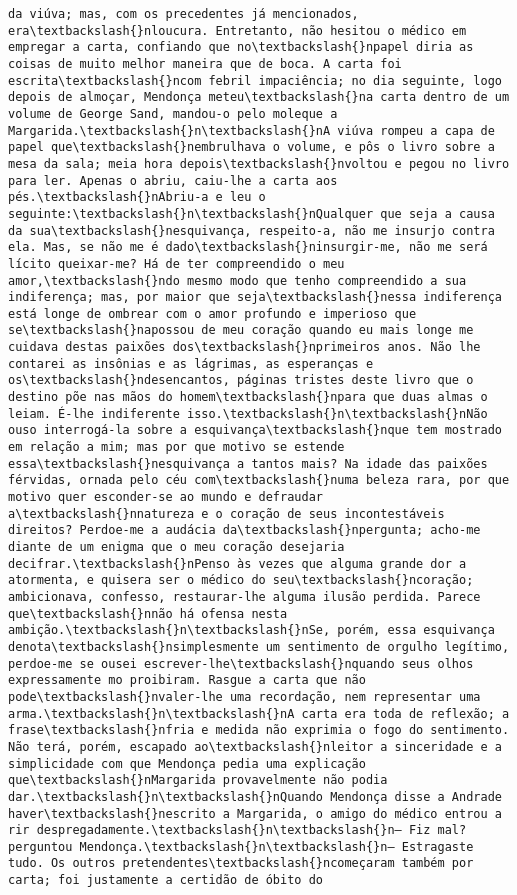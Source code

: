 \documentclass[11pt]{article}
\begin{document}
\begin{Verbatim}[commandchars=\\\{\}]
da viúva; mas, com os precedentes já mencionados, era\textbackslash{}nloucura. Entretanto, não hesitou o médico em empregar a carta, confiando que no\textbackslash{}npapel diria as coisas de muito melhor maneira que de boca. A carta foi escrita\textbackslash{}ncom febril impaciência; no dia seguinte, logo depois de almoçar, Mendonça meteu\textbackslash{}na carta dentro de um volume de George Sand, mandou-o pelo moleque a Margarida.\textbackslash{}n\textbackslash{}nA viúva rompeu a capa de papel que\textbackslash{}nembrulhava o volume, e pôs o livro sobre a mesa da sala; meia hora depois\textbackslash{}nvoltou e pegou no livro para ler. Apenas o abriu, caiu-lhe a carta aos pés.\textbackslash{}nAbriu-a e leu o seguinte:\textbackslash{}n\textbackslash{}nQualquer que seja a causa da sua\textbackslash{}nesquivança, respeito-a, não me insurjo contra ela. Mas, se não me é dado\textbackslash{}ninsurgir-me, não me será lícito queixar-me? Há de ter compreendido o meu amor,\textbackslash{}ndo mesmo modo que tenho compreendido a sua indiferença; mas, por maior que seja\textbackslash{}nessa indiferença está longe de ombrear com o amor profundo e imperioso que se\textbackslash{}napossou de meu coração quando eu mais longe me cuidava destas paixões dos\textbackslash{}nprimeiros anos. Não lhe contarei as insônias e as lágrimas, as esperanças e os\textbackslash{}ndesencantos, páginas tristes deste livro que o destino põe nas mãos do homem\textbackslash{}npara que duas almas o leiam. É-lhe indiferente isso.\textbackslash{}n\textbackslash{}nNão ouso interrogá-la sobre a esquivança\textbackslash{}nque tem mostrado em relação a mim; mas por que motivo se estende essa\textbackslash{}nesquivança a tantos mais? Na idade das paixões férvidas, ornada pelo céu com\textbackslash{}numa beleza rara, por que motivo quer esconder-se ao mundo e defraudar a\textbackslash{}nnatureza e o coração de seus incontestáveis direitos? Perdoe-me a audácia da\textbackslash{}npergunta; acho-me diante de um enigma que o meu coração desejaria decifrar.\textbackslash{}nPenso às vezes que alguma grande dor a atormenta, e quisera ser o médico do seu\textbackslash{}ncoração; ambicionava, confesso, restaurar-lhe alguma ilusão perdida. Parece que\textbackslash{}nnão há ofensa nesta ambição.\textbackslash{}n\textbackslash{}nSe, porém, essa esquivança denota\textbackslash{}nsimplesmente um sentimento de orgulho legítimo, perdoe-me se ousei escrever-lhe\textbackslash{}nquando seus olhos expressamente mo proibiram. Rasgue a carta que não pode\textbackslash{}nvaler-lhe uma recordação, nem representar uma arma.\textbackslash{}n\textbackslash{}nA carta era toda de reflexão; a frase\textbackslash{}nfria e medida não exprimia o fogo do sentimento. Não terá, porém, escapado ao\textbackslash{}nleitor a sinceridade e a simplicidade com que Mendonça pedia uma explicação que\textbackslash{}nMargarida provavelmente não podia dar.\textbackslash{}n\textbackslash{}nQuando Mendonça disse a Andrade haver\textbackslash{}nescrito a Margarida, o amigo do médico entrou a rir despregadamente.\textbackslash{}n\textbackslash{}n— Fiz mal? perguntou Mendonça.\textbackslash{}n\textbackslash{}n— Estragaste tudo. Os outros pretendentes\textbackslash{}ncomeçaram também por carta; foi justamente a certidão de óbito do 
\end{Verbatim}
\end{document}
